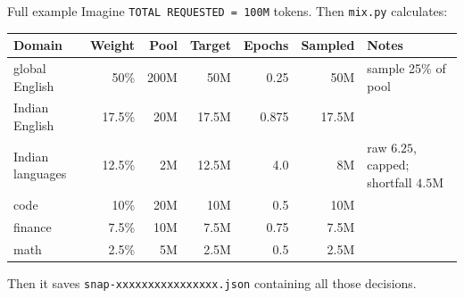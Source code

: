 \begin{paragraphblock}{Full example}
  Imagine \texttt{TOTAL REQUESTED = 100M} tokens. Then \texttt{mix.py}
  calculates:
  \begin{center}
    \renewcommand{\arraystretch}{1.2}
    \small
    \begin{tabular}{@{}l r r r r r l@{}}
      \textbf{Domain} & \textbf{Weight} & \textbf{Pool} &
      \textbf{Target} & \textbf{Epochs} & \textbf{Sampled} &
      \textbf{Notes} \\
      \hline
      global English & 50\% & 200M & 50M & 0.25 & 50M &
      sample 25\% of pool \\
      Indian English & 17.5\% & 20M & 17.5M & 0.875 & 17.5M & \\
      Indian languages & 12.5\% & 2M & 12.5M & 4.0 & 8M &
      raw $6.25$, capped; shortfall $4.5$M \\
      code & 10\% & 20M & 10M & 0.5 & 10M & \\
      finance & 7.5\% & 10M & 7.5M & 0.75 & 7.5M & \\
      math & 2.5\% & 5M & 2.5M & 0.5 & 2.5M & \\
    \end{tabular}
  \end{center}
  Then it saves \texttt{snap-xxxxxxxxxxxxxxxx.json} containing all those
  decisions.
\end{paragraphblock}

